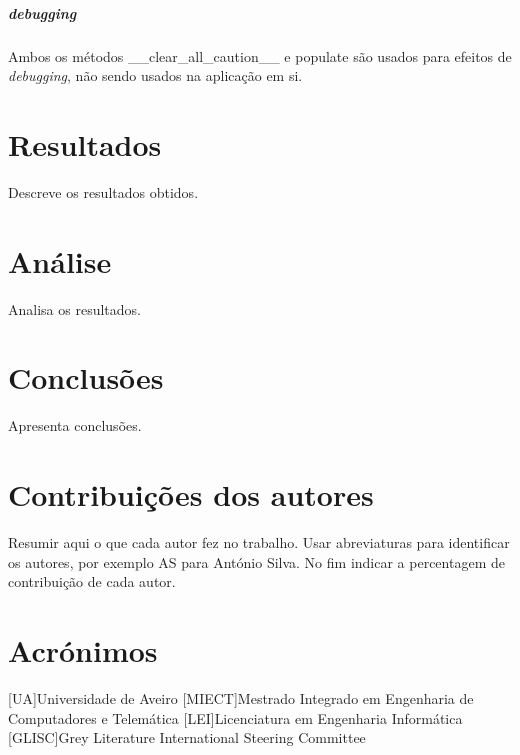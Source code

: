 \documentclass{report}
\begin{document}
\paragraph{debugging}
Ambos os métodos \_\_clear\_all\_caution\_\_ e  populate são usados para efeitos de \textit{debugging}, não sendo usados na aplicação em si.

\chapter{Resultados}
\label{chap.resultados}
Descreve os resultados obtidos.

\chapter{Análise}
\label{chap.analise}
Analisa os resultados.

\chapter{Conclusões}
\label{chap.conclusao}
Apresenta conclusões.

\chapter*{Contribuições dos autores}
Resumir aqui o que cada autor fez no trabalho.
Usar abreviaturas para identificar os autores,
por exemplo AS para António Silva.
No fim indicar a percentagem de contribuição de cada autor.

\chapter*{Acrónimos}
\begin{acronym}
[UA]{Universidade de Aveiro}
[MIECT]{Mestrado Integrado em Engenharia de Computadores e Telemática}
[LEI]{Licenciatura em Engenharia Informática}
[GLISC]{Grey Literature International Steering Committee}
\end{acronym}


\printbibliography
\end{document}
